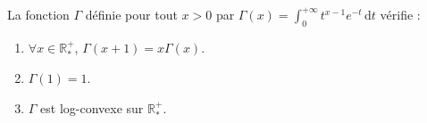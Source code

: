 






  \begin{lemma}
    \label{caracterisation-reelle-de-gamma-1}
    La fonction $\Gamma$ définie pour tout $x > 0$ par $\Gamma(x) = \int_0^{+\infty} t^{x-1} e^{-t} \, \mathrm{d}t$ vérifie :
    \begin{enumerate}[label=(\roman*)]
      \item \label{caracterisation-reelle-de-gamma-2} $\forall x \in \mathbb{R}^+_*$, $\Gamma(x+1) = x\Gamma(x)$.
      \item \label{caracterisation-reelle-de-gamma-3} $\Gamma(1) = 1$.
      \item \label{caracterisation-reelle-de-gamma-4} $\Gamma$ est log-convexe sur $\mathbb{R}^+_*$.
    \end{enumerate}
  \end{lemma}


